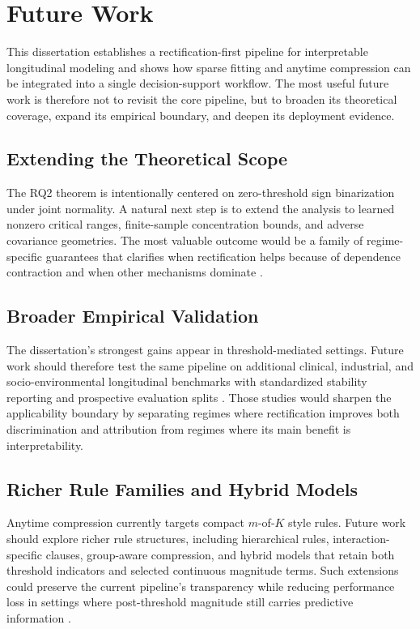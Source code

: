 
\chapter{Future Work}

This dissertation establishes a rectification-first pipeline for interpretable longitudinal modeling and shows how sparse fitting and anytime compression can be integrated into a single decision-support workflow. The most useful future work is therefore not to revisit the core pipeline, but to broaden its theoretical coverage, expand its empirical boundary, and deepen its deployment evidence.

\section{Extending the Theoretical Scope}

The RQ2 theorem is intentionally centered on zero-threshold sign binarization under joint normality. A natural next step is to extend the analysis to learned nonzero critical ranges, finite-sample concentration bounds, and adverse covariance geometries. The most valuable outcome would be a family of regime-specific guarantees that clarifies when rectification helps because of dependence contraction and when other mechanisms dominate \autocite{PZhao2006model,JOrender2025Efficient}.

\section{Broader Empirical Validation}

The dissertation's strongest gains appear in threshold-mediated settings. Future work should therefore test the same pipeline on additional clinical, industrial, and socio-environmental longitudinal benchmarks with standardized stability reporting and prospective evaluation splits \autocites{shin2020,wong2010longitudinal,hiploylee2017,yang2023model}. Those studies would sharpen the applicability boundary by separating regimes where rectification improves both discrimination and attribution from regimes where its main benefit is interpretability.

\section{Richer Rule Families and Hybrid Models}

Anytime compression currently targets compact $m$-of-$K$ style rules. Future work should explore richer rule structures, including hierarchical rules, interaction-specific clauses, group-aware compression, and hybrid models that retain both threshold indicators and selected continuous magnitude terms. Such extensions could preserve the current pipeline's transparency while reducing performance loss in settings where post-threshold magnitude still carries predictive information \autocites{EBoros1997Logical,EBoros2000implementation,EAngelino2018Learning}.

